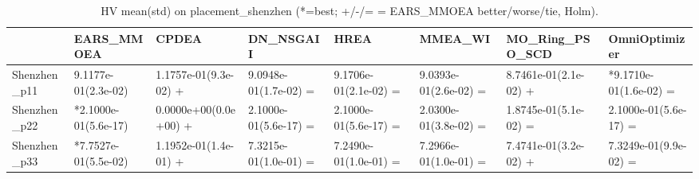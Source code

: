 \begin{table}[t]
\centering
\caption{HV mean(std) on placement_shenzhen (*=best; +/-/= = EARS_MMOEA better/worse/tie, Holm).}
\label{tab:placement_shenzhen_HV}
\begin{tabular}{llllllll}
\toprule
 & EARS\_MMOEA & CPDEA & DN\_NSGAII & HREA & MMEA\_WI & MO\_Ring\_PSO\_SCD & OmniOptimizer \\
\midrule
Shenzhen\_p11 & 9.1177e-01(2.3e-02) & 1.1757e-01(9.3e-02) + & 9.0948e-01(1.7e-02) = & 9.1706e-01(2.1e-02) = & 9.0393e-01(2.6e-02) = & 8.7461e-01(2.1e-02) + & *9.1710e-01(1.6e-02) = \\
Shenzhen\_p22 & *2.1000e-01(5.6e-17) & 0.0000e+00(0.0e+00) + & 2.1000e-01(5.6e-17) = & 2.1000e-01(5.6e-17) = & 2.0300e-01(3.8e-02) = & 1.8745e-01(5.1e-02) = & 2.1000e-01(5.6e-17) = \\
Shenzhen\_p33 & *7.7527e-01(5.5e-02) & 1.1952e-01(1.4e-01) + & 7.3215e-01(1.0e-01) = & 7.2490e-01(1.0e-01) = & 7.2966e-01(1.0e-01) = & 7.4741e-01(3.2e-02) + & 7.3249e-01(9.9e-02) = \\
\bottomrule
\end{tabular}
\end{table}
